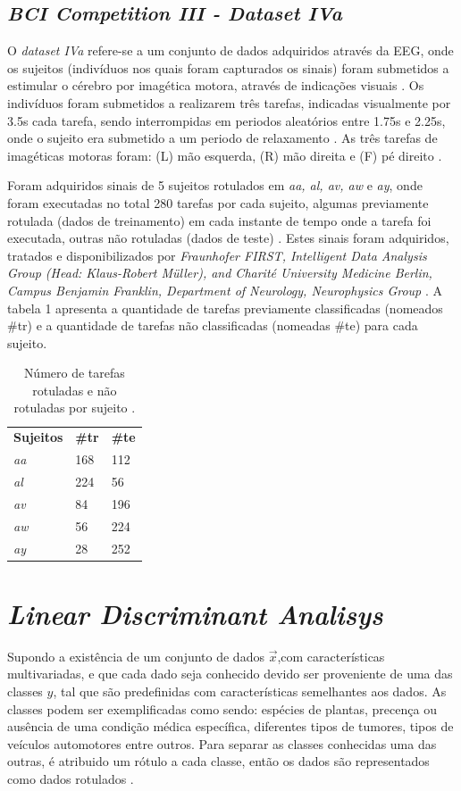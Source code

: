 \subsection{\textit{BCI Competition III - Dataset IVa}}
O \textit{dataset IVa} refere-se a um conjunto de dados adquiridos através da EEG, onde os sujeitos (indivíduos nos quais foram capturados os sinais) foram submetidos a estimular o cérebro por imagética motora, através de indicações visuais \cite{BCICompetition}. Os indivíduos foram submetidos a realizarem três tarefas, indicadas visualmente por 3.5s cada tarefa, sendo interrompidas em periodos aleatórios entre 1.75s e 2.25s, onde o sujeito era submetido a um periodo de relaxamento \cite{BCICompetition}. As três tarefas de imagéticas motoras foram: (L) mão esquerda, (R) mão direita e (F) pé direito \cite{BCICompetition}.

Foram adquiridos sinais de 5 sujeitos rotulados em \textit{aa, al, av, aw} e \textit{ay}, onde foram executadas no total 280 tarefas por cada sujeito, algumas previamente rotulada (dados de treinamento) em cada instante de tempo onde a tarefa foi executada, outras não rotuladas (dados de teste) \cite{siteBCI}. Estes sinais foram adquiridos, tratados e disponibilizados por \textit{Fraunhofer FIRST, Intelligent Data Analysis Group (Head: Klaus-Robert Müller), and Charité University Medicine Berlin, Campus Benjamin Franklin, Department of Neurology, Neurophysics Group} \cite{BCICompetition}. A tabela 1 apresenta a quantidade de tarefas previamente classificadas (nomeados \#tr) e a quantidade de tarefas não classificadas (nomeadas \#te) para cada sujeito.

\begin{table}[h!]
	\centering
	\caption{Número de tarefas rotuladas e não rotuladas por sujeito \cite{BCICompetition}.}
	\label{my-label}
	\begin{tabular}{lll}
		\textbf{Sujeitos} & \textbf{\#tr} & \textbf{\#te} \\
		\textit{aa} & 168 & 112 \\
		\textit{al} & 224 & 56 \\
		\textit{av} & 84 & 196 \\
		\textit{aw} & 56 & 224 \\
		\textit{ay} & 28 & 252
	\end{tabular}
\end{table}
 
\section{\textit{Linear Discriminant Analisys}}
Supondo a existência de um conjunto de dados $\vec x$,com características multivariadas, e que cada dado
seja conhecido devido ser proveniente de uma das  classes $y$, tal que são predefinidas com características
semelhantes aos dados. As classes podem ser exemplificadas como sendo: espécies de plantas,
precença ou ausência de uma condição médica específica, diferentes tipos de tumores, tipos de veículos automotores
entre outros. Para separar as classes conhecidas uma das outras, é atribuido um rótulo a cada classe, então os dados são
representados como dados rotulados \cite{izenmanLDA}.


